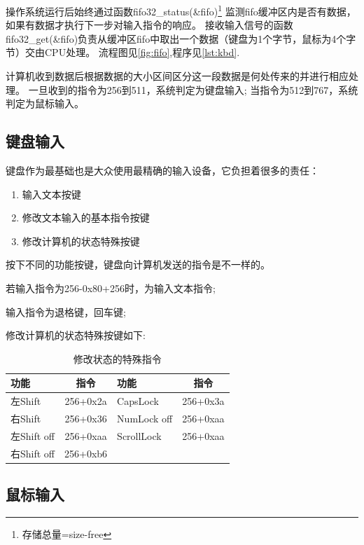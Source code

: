 操作系统运行后始终通过函数fifo32\_status(\&fifo)\footnote{存储总量=size-free}
监测fifo缓冲区内是否有数据，如果有数据才执行下一步对输入指令的响应。
接收输入信号的函数fifo32\_get(\&fifo)负责从缓冲区fifo中取出一个数据（键盘为1个字节，鼠标为4个字节）交由CPU处理。
流程图见\ref{fig:fifo},程序见\ref{lst:kbd}.

计算机收到数据后根据数据的大小区间区分这一段数据是何处传来的并进行相应处理。
一旦收到的指令为256到511，系统判定为键盘输入;
当指令为512到767，系统判定为鼠标输入。


\subsection{键盘输入}

键盘作为最基础也是大众使用最精确的输入设备，它负担着很多的责任：
\begin{enumerate}
\item 输入文本按键
\item 修改文本输入的基本指令按键
\item 修改计算机的状态特殊按键
\end{enumerate}

按下不同的功能按键，键盘向计算机发送的指令是不一样的。

若输入指令为256-0x80+256时，为输入文本指令;

输入指令为退格键，回车键;

修改计算机的状态特殊按键如下:
\begin{table}[!ht]
  \centering
  \begin{tabular}{|l|c|l|c|}
    \hline 功能 & 指令 & 功能 & 指令 \\
    \hline 左Shift & 256+0x2a & CapsLock & 256+0x3a \\ 
    \hline 右Shift & 256+0x36 & NumLock off & 256+0xaa \\
    \hline 左Shift off & 256+0xaa & ScrollLock & 256+0xaa \\
    \hline 右Shift off & 256+0xb6 & & \\
    \hline
  \end{tabular}
  \caption{修改状态的特殊指令}
  \label{tab:hello}
\end{table}


\subsection{鼠标输入}

